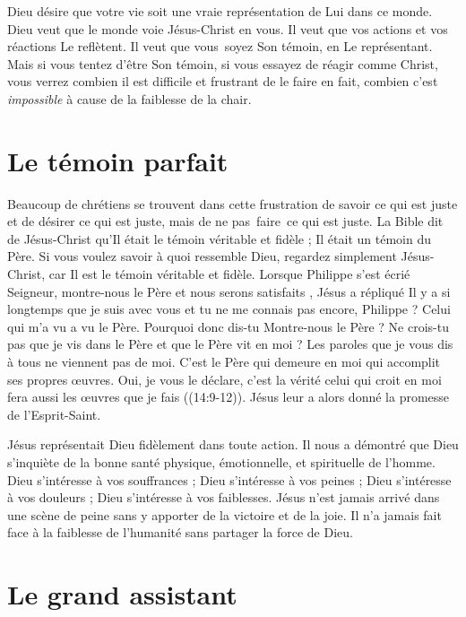 Dieu désire que votre vie soit une vraie représentation de Lui dans ce monde.
 Dieu veut que le monde voie Jésus-Christ en vous.
 Il veut que vos actions et vos réactions Le reflètent.
 Il veut que vous~soyez Son témoin, en Le représentant.
 Mais si vous tentez d'être Son témoin, si vous essayez de réagir comme Christ,
 vous verrez combien il est difficile et frustrant de le faire
 \ocadr en fait, combien c'est \emph{impossible}
 à cause de la faiblesse de la chair.

\section{Le t\'emoin parfait}

Beaucoup de chrétiens se trouvent dans cette frustration de savoir
 ce qui est juste et de désirer ce qui est juste, mais de ne pas~faire~ce
 qui est juste.
 La Bible dit de Jésus-Christ qu'Il était le témoin véritable et fidèle ;
 Il était un témoin du Père.
 Si vous voulez savoir à quoi ressemble Dieu, regardez simplement
 Jésus-Christ, car Il est le témoin véritable et fidèle.
 Lorsque Philippe s'est écrié\frcolon{}
 \Og Seigneur, montre-nous le Père et nous serons satisfaits \Fg{},
 Jésus a répliqué\frcolon{}
 \Og Il y a si longtemps que je suis avec vous et tu ne me connais pas encore,
 Philippe ? Celui qui m'a vu a vu le Père. Pourquoi donc dis-tu\frcolon{}
 \Og Montre-nous le Père \Fg{} ?
 Ne crois-tu pas que je vis dans le Père et que le Père vit en moi ?
 Les paroles que je vous dis à tous ne viennent pas de moi.
 C'est le Père qui demeure en moi qui accomplit ses propres œuvres.
 Oui, je vous le déclare, c'est la vérité\frcolon{}
 celui qui croit en moi fera aussi les œuvres que je fais \Fg{}
 ((14:9-12)). Jésus leur a alors donné la promesse
 de l'Esprit-Saint.

Jésus représentait Dieu fidèlement dans toute action.
 Il nous a démontré que Dieu s'inquiète de la bonne santé physique,
 émotionnelle, et spirituelle de l'homme.
 Dieu s'intéresse à vos souffrances ; Dieu s'intéresse à vos peines ;
 Dieu s'intéresse à vos douleurs ; Dieu s'intéresse à vos faiblesses.
 Jésus n'est jamais arrivé dans une scène de peine sans y apporter
 de la victoire et de la joie. Il n'a jamais fait face à la faiblesse
 de l'humanité sans partager la force de Dieu.

\section{Le grand assistant}

